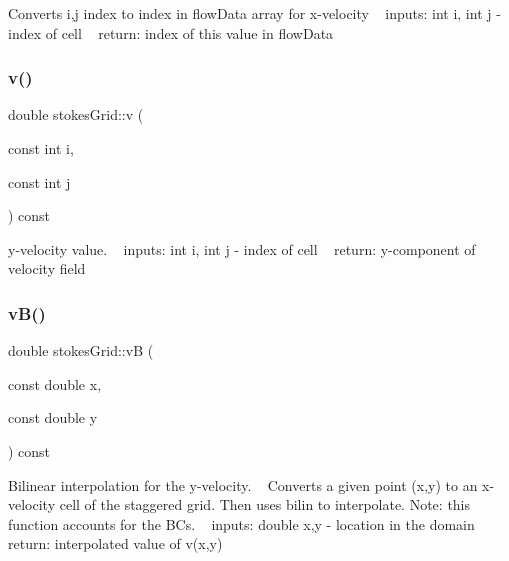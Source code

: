 Converts i,j index to index in flow\+Data array for x-\/velocity ~\newline
inputs\+: int i, int j -\/ index of cell ~\newline
return\+: index of this value in flow\+Data \mbox{\label{classstokesGrid_a7b5a05d7b0ec1771ec3db490a73700f5}} 
\subsubsection{\texorpdfstring{v()}{v()}}
{\footnotesize\ttfamily double stokes\+Grid\+::v (\begin{DoxyParamCaption}\item[{const int}]{i,  }\item[{const int}]{j }\end{DoxyParamCaption}) const}

y-\/velocity value. ~\newline
inputs\+: int i, int j -\/ index of cell ~\newline
return\+: y-\/component of velocity field \mbox{\label{classstokesGrid_a86606c2ec040bf1ab3e1e83202b9c5b0}} 
\subsubsection{\texorpdfstring{v\+B()}{vB()}}
{\footnotesize\ttfamily double stokes\+Grid\+::vB (\begin{DoxyParamCaption}\item[{const double}]{x,  }\item[{const double}]{y }\end{DoxyParamCaption}) const}

Bilinear interpolation for the y-\/velocity. ~\newline
Converts a given point (x,y) to an x-\/velocity cell of the staggered grid. Then uses bilin to interpolate. Note\+: this function accounts for the B\+Cs. ~\newline
inputs\+: double x,y -\/ location in the domain ~\newline
return\+: interpolated value of v(x,y) ~\newline
\mbox{\label{classstokesGrid_a60325ebee955fc114410de83260b681a}} 
